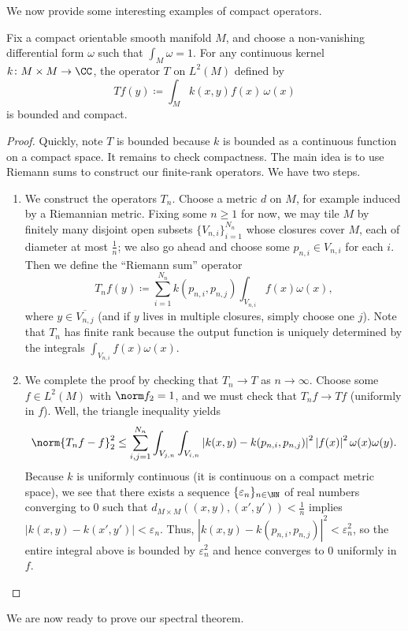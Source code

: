 \documentclass{amsart}
\begin{document}
We now provide some interesting examples of compact operators.
\begin{lemma} \label{lem:convolution-is-compact}
	Fix a compact orientable smooth manifold $M$, and choose a non-vanishing differential form $\omega$ such that $\int_M\omega=1$. For any continuous kernel $k\colon M\times M\to\CC$, the operator $T$ on $L^2(M)$ defined by
	\[Tf(y)\coloneqq\int_Mk(x,y)f(x)\,\omega(x)\]
	is bounded and compact.
\end{lemma}
\begin{proof}
	Quickly, note $T$ is bounded because $k$ is bounded as a continuous function on a compact space. It remains to check compactness. The main idea is to use Riemann sums to construct our finite-rank operators.
	We have two steps.
	\begin{enumerate}
		\item We construct the operators $T_n$. Choose a metric $d$ on $M$, for example induced by a Riemannian metric. Fixing some $n\ge1$ for now, we may tile $M$ by finitely many disjoint open subsets $\{V_{n,i}\}_{i=1}^{N_n}$ whose closures cover $M$, each of diameter at most $\frac1n$; we also go ahead and choose some $p_{n,i}\in V_{n,i}$ for each $i$. Then we define the ``Riemann sum'' operator
		\[T_nf(y)\coloneqq\sum_{i=1}^{N_n}k(p_{n,i},p_{n,j})\int_{V_{n,i}}f(x)\omega(x),\]
		where $y\in\overline{V_{n,j}}$ (and if $y$ lives in multiple closures, simply choose one $j$). Note that $T_n$ has finite rank because the output function is uniquely determined by the integrals $\int_{V_{n,i}}f(x)\omega(x)$.
		\item We complete the proof by checking that $T_n\to T$ as $n\to\infty$. Choose some $f\in L^2(M)$ with $\norm f_2=1$, and we must check that $T_nf\to Tf$ (uniformly in $f$). Well, the triangle inequality yields
		\[\norm{T_nf-f}_2^2\le\sum_{i,j=1}^{N_n}\int_{V_{j,n}}\int_{V_{i,n}}\left|k(x,y)-k(p_{n,i},p_{n,j})\right|^2\left|f(x)\right|^2\omega(x)\omega(y).\]
		Because $k$ is uniformly continuous (it is continuous on a compact metric space), we see that there exists a sequence $\{\varepsilon_n\}_{n\in\NN}$ of real numbers converging to $0$ such that $d_{M\times M}((x,y),(x',y'))<\frac1n$ implies $\left|k(x,y)-k(x',y')\right|<\varepsilon_n$. Thus, $\left|k(x,y)-k(p_{n,i},p_{n,j})\right|^2<\varepsilon_n^2$, so the entire integral above is bounded by $\varepsilon_n^2$ and hence converges to $0$ uniformly in $f$.
		\qedhere
	\end{enumerate}
\end{proof}
We are now ready to prove our spectral theorem.
\end{document}
